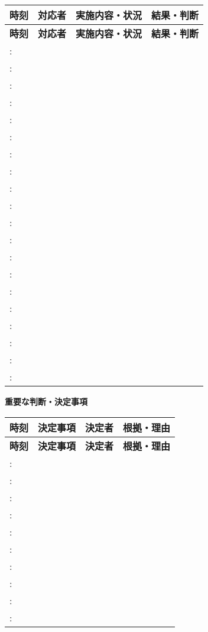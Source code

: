 \documentclass[a4paper,12pt]{jarticle}
\begin{document}
\vspace{3mm}

\begin{longtable}{|p{2cm}|p{2.5cm}|p{4cm}|p{3.5cm}|}
\hline
\textbf{時刻} & \textbf{対応者} & \textbf{実施内容・状況} & \textbf{結果・判断} \\
\hline
\endfirsthead
\hline
\textbf{時刻} & \textbf{対応者} & \textbf{実施内容・状況} & \textbf{結果・判断} \\
\hline
\endhead
: &  &  &  \\[0.5cm]
\hline
: &  &  &  \\[0.5cm]
\hline
: &  &  &  \\[0.5cm]
\hline
: &  &  &  \\[0.5cm]
\hline
: &  &  &  \\[0.5cm]
\hline
: &  &  &  \\[0.5cm]
\hline
: &  &  &  \\[0.5cm]
\hline
: &  &  &  \\[0.5cm]
\hline
: &  &  &  \\[0.5cm]
\hline
: &  &  &  \\[0.5cm]
\hline
: &  &  &  \\[0.5cm]
\hline
: &  &  &  \\[0.5cm]
\hline
: &  &  &  \\[0.5cm]
\hline
: &  &  &  \\[0.5cm]
\hline
: &  &  &  \\[0.5cm]
\hline
: &  &  &  \\[0.5cm]
\hline
: &  &  &  \\[0.5cm]
\hline
: &  &  &  \\[0.5cm]
\hline
: &  &  &  \\[0.5cm]
\hline
: &  &  &  \\[0.5cm]
\hline
\end{longtable}

\begin{center}
\textbf{\large 重要な判断・決定事項}
\end{center}

\vspace{3mm}

\begin{longtable}{|p{2cm}|p{4cm}|p{2.5cm}|p{3.5cm}|}
\hline
\textbf{時刻} & \textbf{決定事項} & \textbf{決定者} & \textbf{根拠・理由} \\
\hline
\endfirsthead
\hline
\textbf{時刻} & \textbf{決定事項} & \textbf{決定者} & \textbf{根拠・理由} \\
\hline
\endhead
: &  &  &  \\[0.5cm]
\hline
: &  &  &  \\[0.5cm]
\hline
: &  &  &  \\[0.5cm]
\hline
: &  &  &  \\[0.5cm]
\hline
: &  &  &  \\[0.5cm]
\hline
: &  &  &  \\[0.5cm]
\hline
: &  &  &  \\[0.5cm]
\hline
: &  &  &  \\[0.5cm]
\hline
: &  &  &  \\[0.5cm]
\hline
: &  &  &  \\[0.5cm]
\hline
\end{longtable}
\end{document}
